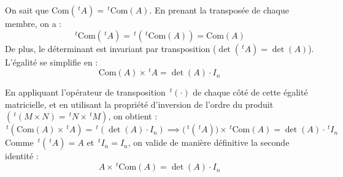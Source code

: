 \documentclass[11pt, a4paper]{article}
\theoremstyle{definition}
\begin{document}
On sait que $\mathrm{Com}(\,^tA) = \,^t\mathrm{Com}(A)$. En prenant la transposée de chaque membre, on a :
$$\,^t\mathrm{Com}(\,^tA) = \,^t(\,^t\mathrm{Com}(A)) = \mathrm{Com}(A)$$
De plus, le déterminant est invariant par transposition ($\det(\,^tA) = \det(A)$). L'égalité se simplifie en :
$$\mathrm{Com}(A) \times \,^tA = \det(A) \cdot I_n$$

En appliquant l'opérateur de transposition $\,^t(\cdot)$ de chaque côté de cette égalité matricielle, et en utilisant la propriété d'inversion de l'ordre du produit $(\,^t(M \times N) = \,^tN \times \,^tM)$, on obtient :
$$\,^t(\mathrm{Com}(A) \times \,^tA) = \,^t(\det(A) \cdot I_n) \implies \bigl(\,^t(\,^tA)\bigr) \times \,^t\mathrm{Com}(A) = \det(A) \cdot \,^tI_n$$
Comme $\,^t(\,^tA) = A$ et $\,^tI_n = I_n$, on valide de manière définitive la seconde identité :
$$A \times \,^t\mathrm{Com}(A) = \det(A) \cdot I_n$$
\end{document}
